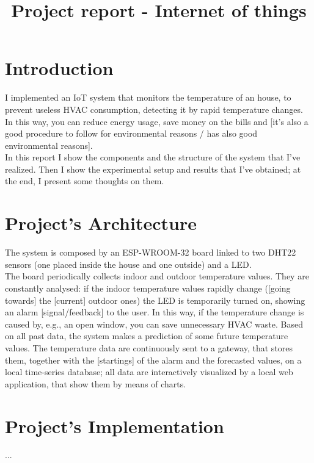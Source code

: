 \documentclass[conference]{IEEEtran}
\begin{document}
\title{Project report - Internet of things}

\author{
}

\maketitle


\section{Introduction}
I implemented an IoT system that monitors the temperature of an house, to prevent useless HVAC consumption, detecting it by rapid temperature changes. In this way, you can reduce energy usage, save money on the bills and [it's also a good procedure to follow for environmental reasons / has also good environmental reasons].\\
In this report I show the components and the structure of the system that I've realized. Then I show the experimental setup and results that I've obtained; at the end, I present some thoughts on them.


\section{Project’s Architecture}
The system is composed by an ESP-WROOM-32 board linked to two DHT22 sensors (one placed inside the house and one outside) and a LED.\\
The board periodically collects indoor and outdoor temperature values. They are constantly analysed: if the indoor temperature values rapidly change ([going towards] the [current] outdoor ones) the LED is temporarily turned on, showing an alarm [signal/feedback] to the user. In this way, if the temperature change is caused by, e.g., an open window, you can save unnecessary HVAC waste. Based on all past data, the system makes a prediction of some future temperature values. The temperature data are continuously sent to a gateway, that stores them, together with the [startings] of the alarm and the forecasted values, on a local time-series database; all data are interactively visualized by a local web application, that show them by means of charts.


\section{Project’s Implementation}
...
\end{document}
